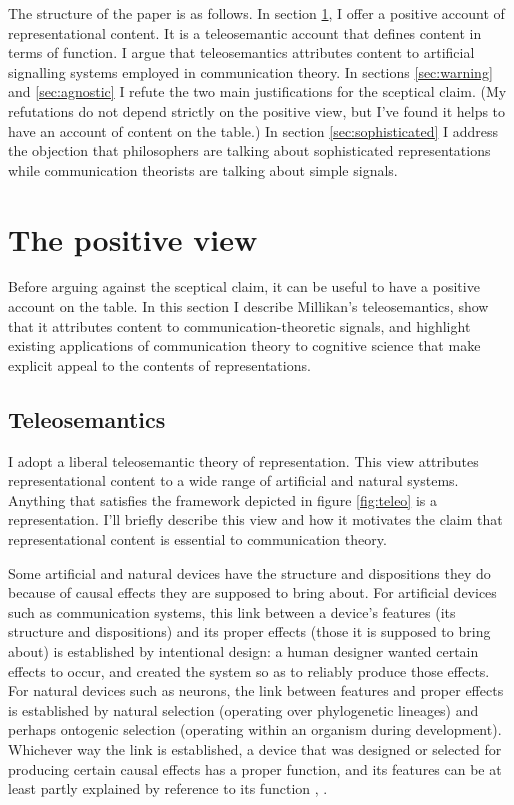 \documentclass[12pt]{article}
\begin{document}
The structure of the paper is as follows.
In section \ref{sec:positive}, I offer a positive account of representational content.
It is a teleosemantic account that defines content in terms of function.
I argue that teleosemantics attributes content to artificial signalling systems employed in communication theory.
In sections \ref{sec:warning} and \ref{sec:agnostic} I refute the two main justifications for the sceptical claim.
(My refutations do not depend strictly on the positive view, but I've found it helps to have an account of content on the table.)
In section \ref{sec:sophisticated} I address the objection that philosophers are talking about sophisticated representations while communication theorists are talking about simple signals.


\section{The positive view}\label{sec:positive}

Before arguing against the sceptical claim, it can be useful to have a positive account on the table.
In this section I describe Millikan's teleosemantics, show that it attributes content to communication-theoretic signals, and highlight existing applications of communication theory to cognitive science that make explicit appeal to the contents of representations.

\subsection{Teleosemantics}
I adopt a liberal teleosemantic theory of representation.
This view attributes representational content to a wide range of artificial and natural systems.
Anything that satisfies the framework depicted in figure \ref{fig:teleo} is a representation.
I'll briefly describe this view and how it motivates the claim that representational content is essential to communication theory.



Some artificial and natural devices have the structure and dispositions they do because of causal effects they are supposed to bring about.
For artificial devices such as communication systems, this link between a device's features (its structure and dispositions) and its proper effects (those it is supposed to bring about) is established by intentional design: a human designer wanted certain effects to occur, and created the system so as to reliably produce those effects.
For natural devices such as neurons, the link between features and proper effects is established by natural selection (operating over phylogenetic lineages) and perhaps ontogenic selection (operating within an organism during development).
Whichever way the link is established, a device that was designed or selected for producing certain causal effects has a proper function, and its features can be at least partly explained by reference to its function \citep[$\SS$1-2]{millikan1984language}, \citep[$\S$2]{millikan1993white}.
\end{document}

